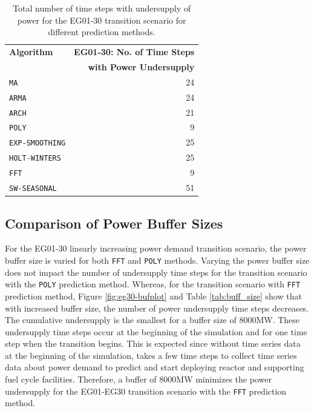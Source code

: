 \begin{table}[]
    \doublespacing
	\centering
        \caption{Total number of time steps with undersupply of power for the 
        EG01-30 transition scenario for different prediction methods.}
		\label{tab:all-power}
		\small
        \begin{tabular}{lr}
		\hline
        \textbf{Algorithm} & \textbf{EG01-30: No. of Time Steps} \\ 
        & \textbf{with Power Undersupply} \\ \hline
		\texttt{MA}     		& 24 \\ 
		\texttt{ARMA}     	    & 24\\ 
		\texttt{ARCH}     	    & 21\\ 
		\texttt{POLY}      		&  9\\ 
		\texttt{EXP-SMOOTHING} 	& 25\\ 
		\texttt{HOLT-WINTERS}  	& 25\\ 
		\texttt{FFT}       		& 9\\ 
		\texttt{SW-SEASONAL}    & 51\\ \hline
	\end{tabular}
\end{table}


\subsection{Comparison of Power Buffer Sizes}
For the EG01-30 linearly increasing power demand 
transition scenario, the power buffer size is varied
for both \texttt{FFT} and \texttt{POLY} methods. 
Varying the power buffer size does not impact the number of 
undersupply time steps for the transition scenario 
with the \texttt{POLY} prediction method.
Whereas, for the transition scenario with \texttt{FFT} prediction method, 
Figure \ref{fig:eg30-bufplot} and Table \ref{tab:buff_size} 
show that with increased buffer size, the number of 
power undersupply time steps decreases. 
The cumulative undersupply is the smallest for a buffer 
size of 8000MW.  
These undersupply time 
steps occur at the beginning of the simulation and for one 
time step when the transition begins. 
This is expected since without time series data 
at the beginning of the simulation, \deploy takes a few 
time steps to collect time series data about power demand 
to predict and start deploying reactor and supporting 
fuel cycle facilities. 
Therefore, a buffer of 8000MW minimizes 
the power undersupply for the EG01-EG30 transition scenario
with the \texttt{FFT} prediction method.

